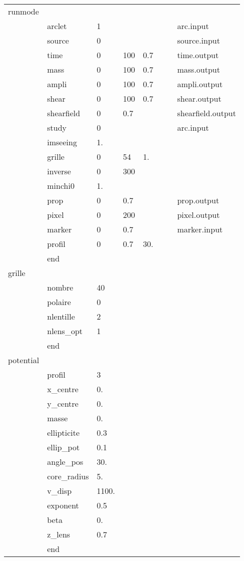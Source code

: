 {\bf
\begin{tabular}{llllllll}
runmode& & & & & & & \\
       & arclet &1 &&&&&arc.input \\
       & source &0 &&&&&source.input \\
       & time   &0 &100 &0.7&&&time.output \\
       & mass   &0 &100 &0.7&&&mass.output \\
       & ampli  &0 &100 &0.7&&&ampli.output \\
       & shear  &0 &100 &0.7&&&shear.output \\
       & shearfield &0 &0.7 &&&&shearfield.output \\
       & study    &0 & & & &&arc.input  \\
       & imseeing &1.& & & & & \\
       & grille   &0 &54& 1.& & & \\
       & inverse  &0 &300&  & & & \\
       & minchi0  & 1.& & & & & \\
       & prop     &0 &0.7 & & &&prop.output \\
       & pixel    &0 &200 & & &&pixel.output \\
       & marker   &0 &0.7 & & &&marker.input \\
       & profil   &0 &0.7 &30.& & & \\
       & end& & & & & &  \\
grille& & & & & & & \\
       & nombre   &      40& & & & & \\
       & polaire  &      0& & & & & \\
       & nlentille&      2& & & & & \\
       & nlens\_opt&      1& & & & & \\
       & end& & & & & & \\
potential& & & & & & & \\
        &profil     &    3& & & & & \\
        &x\_centre   &    0.& & & & & \\
        &y\_centre   &    0.& & & & & \\
        &masse      &    0.& & & & & \\
        &ellipticite&    0.3& & & & & \\
        &ellip\_pot  &    0.1& & & & & \\
        &angle\_pos  &    30.& & & & & \\
        &core\_radius&    5.& & & & & \\
        &v\_disp     &    1100.& & & & & \\
        &exponent   &    0.5& & & & & \\
        &beta       &    0.& & & & & \\
        &z\_lens     &    0.7& & & & & \\
        &end& & & & & &  \\
\end{tabular}
}\\
